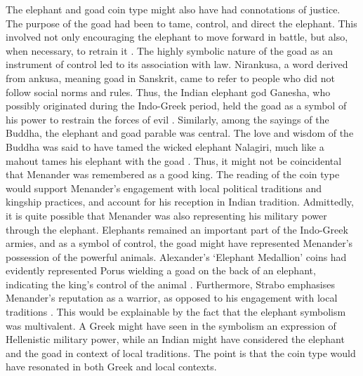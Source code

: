 \documentclass{ijsra}
\begin{document}
The elephant and goad coin type might also have had connotations of justice.
The purpose of the goad had been to tame, control, and direct the elephant. 
This involved not only encouraging the elephant to move forward in battle, but also, when necessary, to retrain it \parencite[66--67]{Trautmann2015}. 
The highly symbolic nature of the goad as an instrument of control led to its association with law. 
Nirankusa, a word derived from ankusa, meaning goad in Sanskrit, came to refer to people who did not follow social norms and rules. 
Thus, the Indian elephant god Ganesha, who possibly originated during the Indo-Greek period, 
held the goad as a symbol of his power to restrain the forces of evil \parencites[96]{Alter2004}[55]{Dhavalikar1991}.%
Similarly, among the sayings of the Buddha, the elephant and goad parable was central. 
The love and wisdom of the Buddha was said to have tamed the wicked elephant Nalagiri, 
much like a mahout tames his elephant with the goad \parencite[96]{Dhammika2005}. 
Thus, it might not be coincidental that Menander was remembered as a good king. 
The reading of the coin type would support Menander’s engagement with local political traditions and kingship practices,
and account for his reception in Indian tradition. 
Admittedly, it is quite possible that Menander was also representing his military power through the elephant. 
Elephants remained an important part of the Indo-Greek armies, and as a symbol of control,
the goad might have represented Menander’s possession of the powerful animals.
Alexander’s ‘Elephant Medallion’ coins had evidently represented Porus wielding a goad on the back of an elephant,
indicating the king’s control of the animal \parencite[204--205]{Stewart1993}.
Furthermore, Strabo emphasises Menander’s reputation as a warrior, as opposed to his engagement with local traditions \parencite[644]{Mairs2014}.
This would be explainable by the fact that the elephant symbolism was multivalent. 
A Greek might have seen in the symbolism an expression of Hellenistic military power,
while an Indian might have considered the elephant and the goad in context of local traditions. 
The point is that the coin type would have resonated in both Greek and local contexts.
\end{document}
